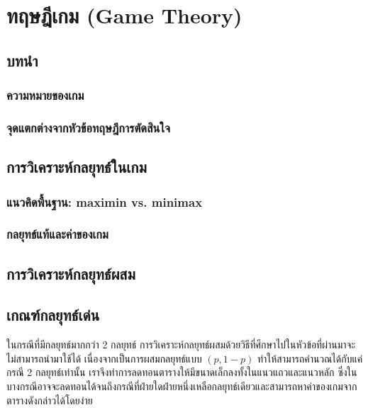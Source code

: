 \chapter{ทฤษฎีเกม (Game Theory)}

\section{บทนำ}
\subsection{ความหมายของเกม}
\subsection{จุดแตกต่างจากหัวข้อทฤษฎีการตัดสินใจ}

\section{การวิเคราะห์กลยุทธ์ในเกม}
\subsection{แนวคิดพื้นฐาน: maximin vs. minimax}
\subsection{กลยุทธ์แท้และค่าของเกม}

\section{การวิเคราะห์กลยุทธ์ผสม}

\newpage


\section{เกณฑ์กลยุทธ์เด่น}
ในกรณีที่มีกลยุทธ์มากกว่า 2 กลยุทธ์ การวิเคราะห์กลยุทธ์ผสมด้วยวิธีที่ศึกษาไปในหัวข้อที่ผ่านมาจะไม่สามารถนำมาใช้ได้ เนื่องจากเป็นการผสมกลยุทธ์แบบ $(p, 1-p)$ ทำให้สามารถคำนวณได้กับแค่กรณี 2 กลยุทธ์เท่านั้น เราจึงทำการลดทอนตารางให้มีขนาดเล็กลงทั้งในแนวแถวและแนวหลัก ซึ่งในบางกรณีอาจจะลดทอนได้จนถึงกรณีที่ฝ่ายใดฝ่ายหนึ่งเหลือกลยุทธ์เดียวและสามารถหาค่าของเกมจากตารางดังกล่าวได้โดยง่าย

